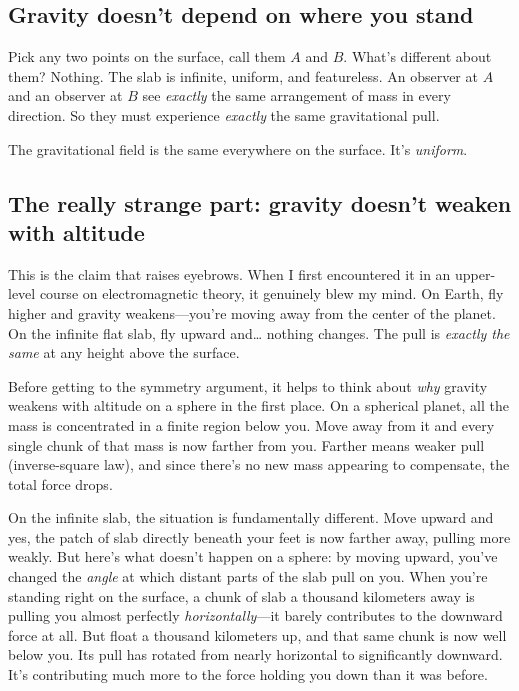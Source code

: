 \documentclass[11pt, letterpaper]{article}
\begin{document}
\subsection{Gravity doesn't depend on where you stand}

Pick any two points on the surface, call them $A$ and $B$. What's different about them? Nothing. The slab is infinite, uniform, and featureless. An observer at $A$ and an observer at $B$ see \textit{exactly} the same arrangement of mass in every direction. So they must experience \textit{exactly} the same gravitational pull.

The gravitational field is the same everywhere on the surface. It's \textit{uniform}.

\subsection{The really strange part: gravity doesn't weaken with altitude}

This is the claim that raises eyebrows. When I first encountered it in an upper-level course on electromagnetic theory, it genuinely blew my mind. On Earth, fly higher and gravity weakens---you're moving away from the center of the planet. On the infinite flat slab, fly upward and\ldots{} nothing changes. The pull is \textit{exactly the same} at any height above the surface.

Before getting to the symmetry argument, it helps to think about \textit{why} gravity weakens with altitude on a sphere in the first place. On a spherical planet, all the mass is concentrated in a finite region below you. Move away from it and every single chunk of that mass is now farther from you. Farther means weaker pull (inverse-square law), and since there's no new mass appearing to compensate, the total force drops.

On the infinite slab, the situation is fundamentally different. Move upward and yes, the patch of slab directly beneath your feet is now farther away, pulling more weakly. But here's what doesn't happen on a sphere: by moving upward, you've changed the \textit{angle} at which distant parts of the slab pull on you. When you're standing right on the surface, a chunk of slab a thousand kilometers away is pulling you almost perfectly \textit{horizontally}---it barely contributes to the downward force at all. But float a thousand kilometers up, and that same chunk is now well below you. Its pull has rotated from nearly horizontal to significantly downward. It's contributing much more to the force holding you down than it was before.
\end{document}

